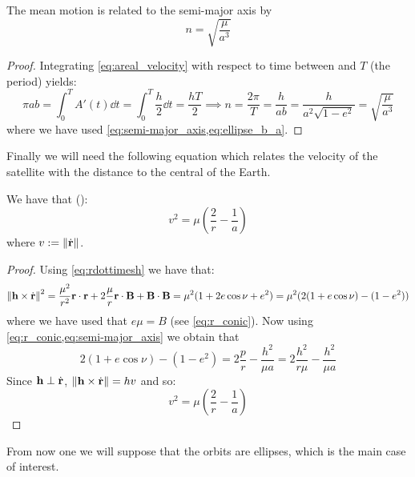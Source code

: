 \documentclass[../main.tex]{subfiles}
\begin{document}
\begin{proposition}\label{prop:kepler_third_law}
  The mean motion is related to the semi-major axis by
  \begin{equation}
    n=\sqrt{\frac{\mu}{a^3}}
  \end{equation}
\end{proposition}
\begin{proof}
  Integrating \cref{eq:areal_velocity} with respect to time between  and $T$ (the period) yields:
  \begin{equation}
    \pi a b=\int_0^T A'(t)\dd{t}=\int_0^T \frac{h}{2}\dd{t}=\frac{hT}{2}\implies n=\frac{2\pi}{T}=\frac{h}{a b}=\frac{h}{a^2\sqrt{1-e^2}}=\sqrt{\frac{\mu}{a^3}}
  \end{equation}
  where we have used \cref{eq:semi-major_axis,eq:ellipse_b_a}.
\end{proof}
Finally we will need the following equation which relates the velocity of the satellite with the distance to the central of the Earth.
\begin{proposition}
  We have that (\cite{montenbruck}):
  \begin{equation}\label{eq:visviva}
    v^2=\mu\left(\frac{2}{r}-\frac{1}{a}\right)
  \end{equation}
  where $v:=\left\|\dot{\boldsymbol{\mathrm{r}}}\right\|$.
\end{proposition}
\begin{proof}
  Using \cref{eq:rdottimesh} we have that:
  \begin{equation}
    \left\|\boldsymbol{\mathrm{h}}\times\dot{\boldsymbol{\mathrm{r}}}\right\|^2=\frac{\mu^2}{r^2}\boldsymbol{\mathrm{r}}\cdot\boldsymbol{\mathrm{r}}+2\frac{\mu}{r}\boldsymbol{\mathrm{r}}\cdot\boldsymbol{\mathrm{B}}+\boldsymbol{\mathrm{B}} \cdot \boldsymbol{\mathrm{B}}=\mu^2(1+2 e\cos\nu + e^2)=\mu^2(2(1+ e\cos\nu) -(1- e^2))
  \end{equation}
  where we have used that $e\mu=B$ (see \cref{eq:r_conic}). Now using \cref{eq:r_conic,eq:semi-major_axis} we obtain that
  \begin{equation}
    2(1+ e\cos\nu) -(1- e^2)=2\frac{p}{r}-\frac{h^2}{\mu a}=2\frac{h^2}{r\mu}-\frac{h^2}{\mu a}
  \end{equation}
  Since $\boldsymbol{\mathrm{h}}\perp\dot{\boldsymbol{\mathrm{r}}}$, $\left\|\boldsymbol{\mathrm{h}}\times\dot{\boldsymbol{\mathrm{r}}}\right\|=hv$ and so:
  \begin{equation}
    v^2=\mu\left(\frac{2}{r}-\frac{1}{a}\right)
  \end{equation}
\end{proof}
From now one we will suppose that the orbits are ellipses, which is the main case of interest.
\end{document}
